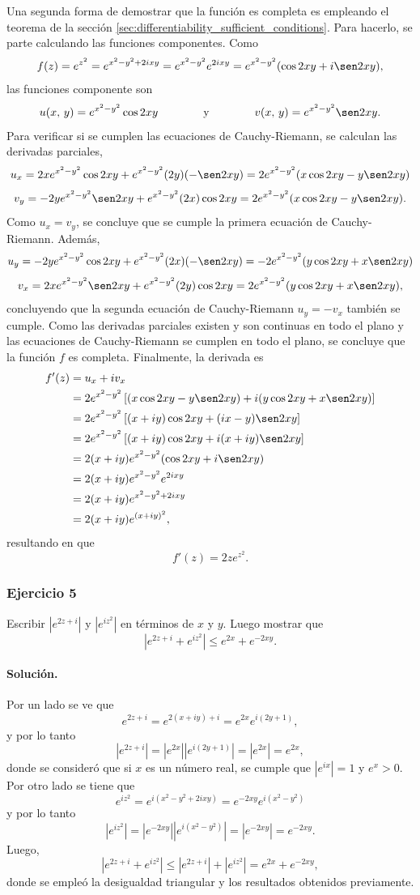 \documentclass[a4paper]{report}
\begin{document}
Una segunda forma de demostrar que la función es completa es empleando el teorema de la sección \ref{sec:differentiability_sufficient_conditions}. Para hacerlo, se parte calculando las funciones componentes. Como
\[
 f(z)=e^{z^2}=e^{x^2-y^2+2ixy}=e^{x^2-y^2}e^{2ixy}=e^{x^2-y^2}(\cos2xy+i\sen2xy),
\]
las funciones componente son
\[
 u(x,\,y)=e^{x^2-y^2}\cos2xy
 \qquad\qquad\textrm{y}\qquad\qquad
 v(x,\,y)=e^{x^2-y^2}\sen2xy.
\]
Para verificar si se cumplen las ecuaciones de Cauchy-Riemann, se calculan las derivadas parciales,
\[
 u_x=2xe^{x^2-y^2}\cos2xy+e^{x^2-y^2}(2y)(-\sen2xy)=2e^{x^2-y^2}(x\cos2xy-y\sen2xy)
\]
\[
 v_y=-2ye^{x^2-y^2}\sen2xy+e^{x^2-y^2}(2x)\cos2xy=2e^{x^2-y^2}(x\cos2xy-y\sen2xy).
\]
Como \(u_x=v_y\), se concluye que se cumple la primera ecuación de Cauchy-Riemann. Además,
\[
 u_y=-2ye^{x^2-y^2}\cos2xy+e^{x^2-y^2}(2x)(-\sen2xy)=-2e^{x^2-y^2}(y\cos2xy+x\sen2xy)
\]
\[
 v_x=2xe^{x^2-y^2}\sen2xy+e^{x^2-y^2}(2y)\cos2xy=2e^{x^2-y^2}(y\cos2xy+x\sen2xy),
\]
concluyendo que la segunda ecuación de Cauchy-Riemann \(u_y=-v_x\) también se cumple. Como las derivadas parciales existen y son continuas en todo el plano y las ecuaciones de Cauchy-Riemann se cumplen en todo el plano, se concluye que la función \(f\) es completa. Finalmente, la derivada es
\begin{align*}
 f'(z)&=u_x+iv_x\\
  &=2e^{x^2-y^2}\left[(x\cos2xy-y\sen2xy)+i(y\cos2xy+x\sen2xy)\right]\\
  &=2e^{x^2-y^2}\left[(x+iy)\cos2xy+(ix-y)\sen2xy\right]\\
  &=2e^{x^2-y^2}\left[(x+iy)\cos2xy+i(x+iy)\sen2xy\right]\\
  &=2(x+iy)e^{x^2-y^2}(\cos2xy+i\sen2xy)\\
  &=2(x+iy)e^{x^2-y^2}e^{2ixy}\\
  &=2(x+iy)e^{x^2-y^2+2ixy}\\
  &=2(x+iy)e^{(x+iy)^2},
\end{align*}
resultando en que
\[
 f'(z)=2ze^{z^2}.
\]

\subsubsection{Ejercicio 5}

Escribir \(|e^{2z+i}|\) y \(|e^{iz^2}|\) en términos de \(x\) y \(y\). Luego mostrar que 
\[
 |e^{2z+i}+e^{iz^2}|\leq e^{2x}+e^{-2xy}.
\]

\paragraph{Solución.} Por un lado se ve que 
\[
 e^{2z+i}=e^{2(x+iy)+i}=e^{2x}e^{i(2y+1)},
\]
y por lo tanto
\[
 |e^{2z+i}|=|e^{2x}||e^{i(2y+1)}|=|e^{2x}|=e^{2x},
\]
donde se consideró que si \(x\) es un número real, se cumple que \(|e^{ix}|=1\) y \(e^x>0\). Por otro lado se tiene que 
\[
 e^{iz^2}=e^{i(x^2-y^2+2ixy)}=e^{-2xy}e^{i(x^2-y^2)}
\]
y por lo tanto
\[
 |e^{iz^2}|=|e^{-2xy}||e^{i(x^2-y^2)}|=|e^{-2xy}|=e^{-2xy}.
\]
Luego,
\[
 |e^{2z+i}+e^{iz^2}|\leq|e^{2z+i}|+|e^{iz^2}|=e^{2x}+e^{-2xy},
\]
donde se empleó la desigualdad triangular y los resultados obtenidos previamente.
\end{document}
